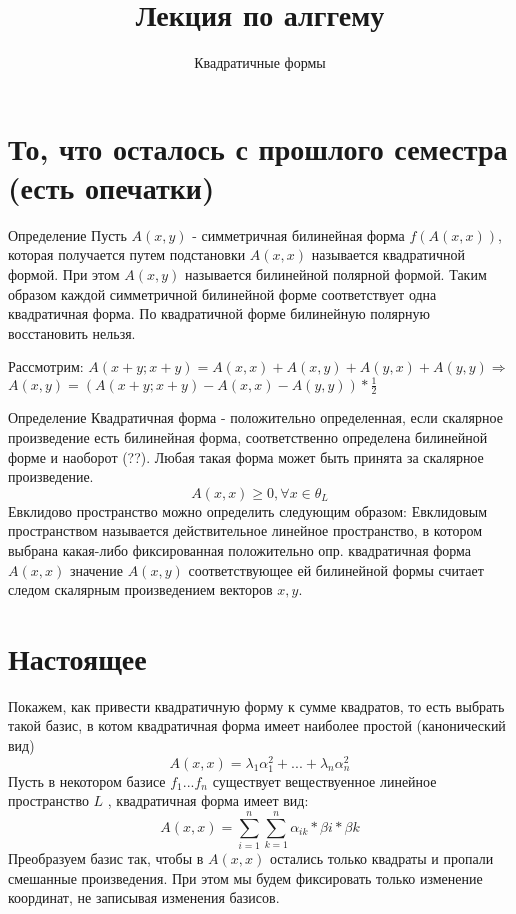 \documentclass{article}
\title{Лекция по алггему}
\author{Квадратичные формы}
\begin{document}
\maketitle

\section{То, что осталось с прошлого семестра (есть опечатки)}
Определение \newline
Пусть  \(A(x,y)\) - симметричная билинейная форма \newline
\(f(A(x,x)) \), которая получается путем подстановки \(A(x,x) \) называется квадратичной формой. При этом \( A(x,y)\) называется билинейной полярной формой. \newline 
Таким образом каждой симметричной билинейной форме соответствует одна квадратичная форма. \newline
По квадратичной форме билинейную полярную восстановить нельзя.\newline 

Рассмотрим:\newline
\(A(x+y; x+y) = A(x,x) + A(x,y) + A(y, x) + A(y,y) \Rightarrow 
\)
\(A(x,y) = (A(x+y; x+y) - A(x, x) - A(y,y)) * \frac{1}{2}\)

Определение\newline
Квадратичная форма - положительно определенная, если скалярное произведение есть билинейная форма, соответственно определена билинейной форме и наоборот (??).\newline
Любая такая форма может быть принята за скалярное произведение.\newline
\[A(x,x) \geq 0{ , }\forall x \in \theta_L\]\newline
Евклидово пространство можно определить следующим образом:\newline
Евклидовым пространством называется действительное линейное пространство, в котором выбрана какая-либо фиксированная положительно опр. квадратичная форма \(A(x,x)\) значение \(A(x,y)\) соответствующее ей билинейной формы считает следом скалярным произведением векторов \( x,y\).\newline

\section{Настоящее}
Покажем, как привести квадратичную форму к сумме квадратов, то есть выбрать такой базис, в котом квадратичная форма имеет наиболее простой (канонический вид)\newline
\[A(x,x) = \lambda_{1}\alpha_1^2 + ... + \lambda_{n}\alpha_n^2\]\newline
Пусть в некотором базисе \(f_{1}...f_{n}\) существует веществуенное линейное пространство \(L\) , квадратичная форма имеет вид:\newline
\[A(x,x) =\sum_{i = 1}^{n}\sum_{k = 1}^{n}\alpha_{ik}*\beta{i}*\beta{k}\]\newline
Преобразуем базис так, чтобы в \(A(x,x)\) остались только квадраты и пропали смешанные произведения. \newline
При этом мы будем фиксировать только изменение координат, не записывая изменения базисов. \newline
\end{document}
